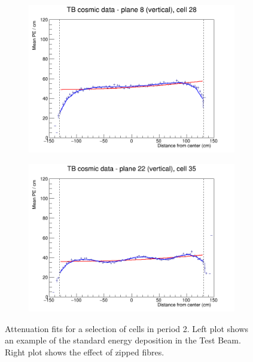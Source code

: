 \documentclass[12pt,a4paper]{article}
\begin{document}
\begin{figure}[h]
  \begin{subfigure}{0.5\textwidth}
    \includegraphics[width=\linewidth]{RelativeCalibrationResults/p2_008_028.png}
  \end{subfigure}
  \begin{subfigure}{0.5\textwidth}
    \includegraphics[width=\linewidth]{RelativeCalibrationResults/p2_022_035.png}
  \end{subfigure}
  \caption{Attenuation fits for a selection of cells in period 2. Left plot shows an example of the standard energy deposition in the Test Beam. Right plot shows the effect of zipped fibres.}
  \label{figAttenfitResultsPerio2_ZippedFibers}
\end{figure}
\end{document}
